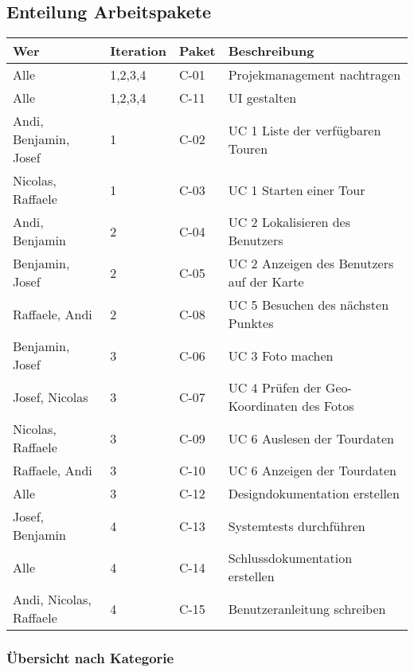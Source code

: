 \subsection{Enteilung Arbeitspakete}\label{enteilung-arbeitspakete}
\begin{longtabu} to \textwidth { | l | l | l | X[l] | }
\hline
\textbf{Wer} & \textbf{Iteration} & \textbf{Paket} & \textbf{Beschreibung} \\\hline
\endhead

Alle                         & 1,2,3,4 & C-01 & Projekmanagement nachtragen \\\hline
Alle                         & 1,2,3,4 & C-11 & UI gestalten \\\hline
Andi, Benjamin, Josef        & 1       & C-02 & UC 1 Liste der verfügbaren Touren \\\hline
Nicolas, Raffaele            & 1       & C-03 & UC 1 Starten einer Tour \\\hline
Andi, Benjamin               & 2       & C-04 & UC 2 Lokalisieren des Benutzers \\\hline
Benjamin, Josef              & 2       & C-05 & UC 2 Anzeigen des Benutzers auf der Karte \\\hline
Raffaele, Andi               & 2       & C-08 & UC 5 Besuchen des nächsten Punktes \\\hline
Benjamin, Josef              & 3       & C-06 & UC 3 Foto machen \\\hline
Josef, Nicolas               & 3       & C-07 & UC 4 Prüfen der Geo-Koordinaten des Fotos \\\hline
Nicolas, Raffaele            & 3       & C-09 & UC 6 Auslesen der Tourdaten \\\hline
Raffaele, Andi               & 3       & C-10 & UC 6 Anzeigen der Tourdaten \\\hline
Alle                         & 3       & C-12 & Designdokumentation erstellen \\\hline
Josef, Benjamin              & 4       & C-13 & Systemtests durchführen \\\hline
Alle                         & 4       & C-14 & Schlussdokumentation erstellen \\\hline
Andi, Nicolas, Raffaele      & 4       & C-15 & Benutzeranleitung schreiben \\\hline
\end{longtabu}

\subsubsection{Übersicht nach Kategorie}

